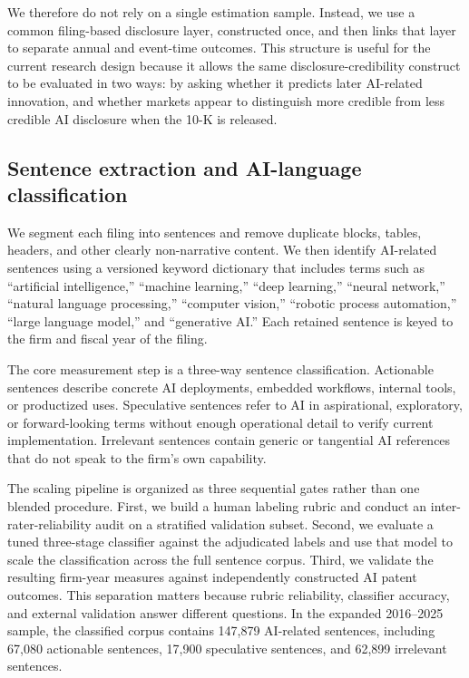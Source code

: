 We therefore do not rely on a single estimation sample. Instead, we use a common filing-based disclosure layer, constructed once, and then links that layer to separate annual and event-time outcomes. This structure is useful for the current research design because it allows the same disclosure-credibility construct to be evaluated in two ways: by asking whether it predicts later AI-related innovation, and whether markets appear to distinguish more credible from less credible AI disclosure when the 10-K is released.

\subsection{Sentence extraction and AI-language classification}

We segment each filing into sentences and remove duplicate blocks, tables, headers, and other clearly non-narrative content. We then identify AI-related sentences using a versioned keyword dictionary that includes terms such as ``artificial intelligence,'' ``machine learning,'' ``deep learning,'' ``neural network,'' ``natural language processing,'' ``computer vision,'' ``robotic process automation,'' ``large language model,'' and ``generative AI.'' Each retained sentence is keyed to the firm and fiscal year of the filing.

The core measurement step is a three-way sentence classification. Actionable sentences describe concrete AI deployments, embedded workflows, internal tools, or productized uses. Speculative sentences refer to AI in aspirational, exploratory, or forward-looking terms without enough operational detail to verify current implementation. Irrelevant sentences contain generic or tangential AI references that do not speak to the firm's own capability.

The scaling pipeline is organized as three sequential gates rather than one blended procedure. First, we build a human labeling rubric and conduct an inter-rater-reliability audit on a stratified validation subset. Second, we evaluate a tuned three-stage classifier against the adjudicated labels and use that model to scale the classification across the full sentence corpus. Third, we validate the resulting firm-year measures against independently constructed AI patent outcomes. This separation matters because rubric reliability, classifier accuracy, and external validation answer different questions. In the expanded 2016--2025 sample, the classified corpus contains 147,879 AI-related sentences, including 67,080 actionable sentences, 17,900 speculative sentences, and 62,899 irrelevant sentences.

